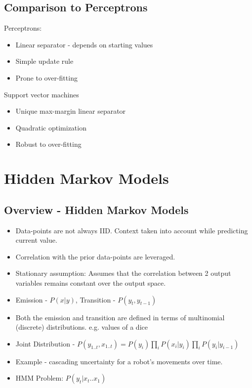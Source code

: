 \documentclass[parskip=half]{scrartcl}
\begin{document}
    \subsection{Comparison to Perceptrons} %
    \label{sub:comparison_to_perceptrons}

    Perceptrons:
    \begin{itemize}
        \item 
        Linear separator - depends on starting values
        \item 
        Simple update rule
        \item 
        Prone to over-fitting
    \end{itemize}

    Support vector machines
    \begin{itemize}
        \item 
        Unique max-margin linear separator
        \item 
        Quadratic optimization
        \item 
        Robust to over-fitting
    \end{itemize}
    



\newpage


\section{Hidden Markov Models} %
\label{sec:hidden_markov_models}

    \subsection{Overview - Hidden Markov Models} %
    \label{sub:overview_hidden_markov_models}
        
        \begin{itemize}
            \item Data-points are not always IID. Context taken into account while predicting current value.
            \item Correlation with the prior data-points are leveraged.
            \item Stationary assumption: Assumes that the correlation between 2 output variables remains constant over the output space.
            \item Emission - $P(x|y)$, Transition - $P(y_t, y_{t-1})$
            \item Both the emission and transition are defined in terms of multinomial (discrete) distributions. e.g. values of a dice
            \item Joint Distribution - $P(y_{1..t}, x_{1..t}) = P(y_i) \prod_i P(x_i|y_i) \prod_i P(y_i|y_{i-1}) $
            \item Example - cascading uncertainty for a robot's movements over time.
            \item HMM Problem: $P(y_t|x_t .. x_1) $
        \end{itemize}
\end{document}
